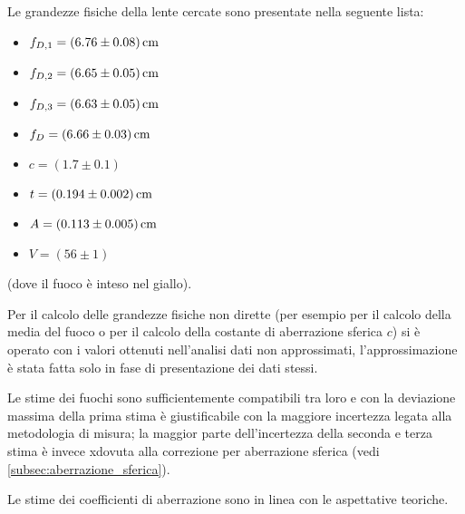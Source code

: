 Le grandezze fisiche della lente cercate sono presentate nella seguente lista:
\begin{itemize}
\item $f_{D,1} = (6.76 \pm 0.08) \,\mathrm{cm}$
\item $f_{D,2} = (6.65 \pm 0.05) \,\mathrm{cm}$
\item $f_{D,3} = (6.63 \pm 0.05) \,\mathrm{cm}$
\item $f_D = (6.66 \pm 0.03) \,\mathrm{cm}$
\item $c = (1.7 \pm 0.1)$
\item $t = (0.194 \pm 0.002) \,\mathrm{cm}$
\item $A = (0.113 \pm 0.005) \,\mathrm{cm}$
\item $V = (56 \pm 1)$  
\end{itemize}
(dove il fuoco \`e inteso nel giallo).

Per il calcolo delle grandezze fisiche non dirette (per esempio per il calcolo della media del fuoco o per il calcolo della costante di aberrazione sferica $c$) si \`e operato con i valori ottenuti nell'analisi dati non approssimati, l'approssimazione \`e stata fatta solo in fase di presentazione dei dati stessi.

Le stime dei fuochi sono sufficientemente compatibili tra loro e con la deviazione massima della prima stima è giustificabile con la maggiore incertezza legata alla metodologia di misura; la maggior parte dell'incertezza della seconda e terza stima \`e invece xdovuta alla correzione per aberrazione sferica (vedi \autoref{subsec:aberrazione_sferica}).

Le stime dei coefficienti di aberrazione sono in linea con le aspettative teoriche.
